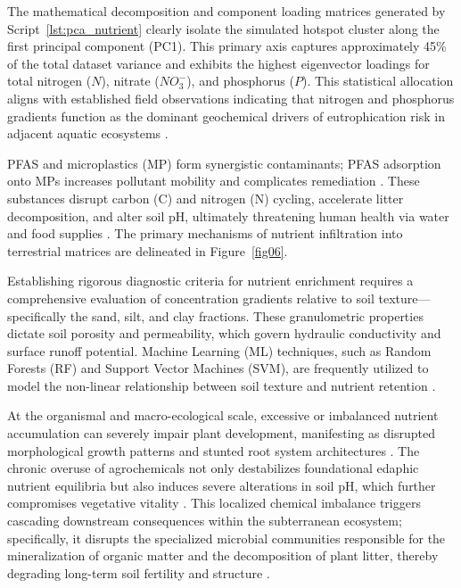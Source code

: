 \documentclass[environments,article,submit,pdftex,moreauthors]{Definitions/mdpi}
\begin{document}
The mathematical decomposition and component loading matrices generated by Script~\ref{lst:pca_nutrient} clearly isolate the simulated hotspot cluster along the first principal component (PC1). This primary axis captures approximately 45\% of the total dataset variance and exhibits the highest eigenvector loadings for total nitrogen ($N$), nitrate ($NO_3^-$), and phosphorus ($P$). This statistical allocation aligns with established field observations indicating that nitrogen and phosphorus gradients function as the dominant geochemical drivers of eutrophication risk in adjacent aquatic ecosystems \cite{Guan2024,Xu2025}.

PFAS and microplastics (MP) form synergistic contaminants; PFAS adsorption
onto MPs increases pollutant mobility and complicates remediation
\cite{Shen2024}. These substances disrupt carbon (C) and nitrogen (N) cycling,
accelerate litter decomposition, and alter soil pH, ultimately threatening
human health via water and food supplies
\cite{Hossini2025,Appel2022,Cheng2025,Arnesdotter2025}. The primary mechanisms
of nutrient infiltration into terrestrial matrices are delineated in
Figure~\ref{fig06}.

Establishing rigorous diagnostic criteria for nutrient enrichment requires a
comprehensive evaluation of concentration gradients relative to soil
texture---specifically the sand, silt, and clay fractions. These granulometric
properties dictate soil porosity and permeability, which govern hydraulic
conductivity and surface runoff potential. Machine Learning (ML) techniques,
such as Random Forests (RF) and Support Vector Machines (SVM), are frequently
utilized to model the non-linear relationship between soil texture and nutrient
retention \cite{Folorunso}. 

At the organismal and macro-ecological scale, excessive or imbalanced nutrient accumulation can severely impair plant development, manifesting as disrupted morphological growth patterns and stunted root system architectures \cite{Gang2004,Guo2021}. The chronic overuse of agrochemicals not only destabilizes foundational edaphic nutrient equilibria but also induces severe alterations in soil pH, which further compromises vegetative vitality \cite{Rahman2014}. This localized chemical imbalance triggers cascading downstream consequences within the subterranean ecosystem; specifically, it disrupts the specialized microbial communities responsible for the mineralization of organic matter and the decomposition of plant litter, thereby degrading long-term soil fertility and structure \cite{Atoloye2024}. 
\end{document}
